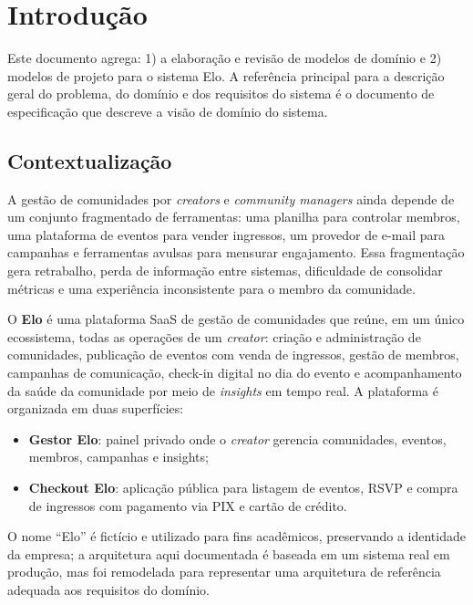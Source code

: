 \documentclass[12pt, a4paper]{article}
\begin{document}
\newpage
\setcounter{page}{1}

\section{Introdução}

Este documento agrega: 1) a elaboração e revisão de modelos de domínio e
2) modelos de projeto para o sistema Elo. A referência principal para a
descrição geral do problema, do domínio e dos requisitos do sistema é o
documento de especificação que descreve a visão de domínio do sistema.

\subsection{Contextualização}

A gestão de comunidades por \textit{creators} e \textit{community managers}
ainda depende de um conjunto fragmentado de ferramentas: uma planilha para
controlar membros, uma plataforma de eventos para vender ingressos, um
provedor de e-mail para campanhas e ferramentas avulsas para mensurar
engajamento. Essa fragmentação gera retrabalho, perda de informação entre
sistemas, dificuldade de consolidar métricas e uma experiência inconsistente
para o membro da comunidade.

O \textbf{Elo} é uma plataforma SaaS de gestão de comunidades que reúne, em um
único ecossistema, todas as operações de um \textit{creator}: criação e
administração de comunidades, publicação de eventos com venda de ingressos,
gestão de membros, campanhas de comunicação, check-in digital no dia do evento
e acompanhamento da saúde da comunidade por meio de \textit{insights} em tempo
real. A plataforma é organizada em duas superfícies:

\begin{itemize}
  \item \textbf{Gestor Elo}: painel privado onde o \textit{creator} gerencia
        comunidades, eventos, membros, campanhas e insights;
  \item \textbf{Checkout Elo}: aplicação pública para listagem de eventos,
        RSVP e compra de ingressos com pagamento via PIX e cartão de crédito.
\end{itemize}

O nome ``Elo'' é fictício e utilizado para fins acadêmicos, preservando a
identidade da empresa; a arquitetura aqui documentada é baseada em um sistema
real em produção, mas foi remodelada para representar uma arquitetura de
referência adequada aos requisitos do domínio.
\end{document}
